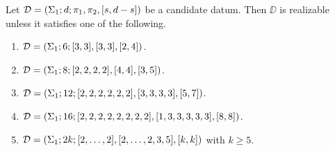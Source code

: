 \begin{theorem} \label{short-partition:th:realizability-on-torus-n-3}
Let $\mathcal{D}=(\Sigma_{1};d;\pi_1,\pi_2,[s,d-s])$ be a candidate datum. Then $\DD$ is realizable unless it satisfies one of the following.
\begin{enumerate}[(1)]
\item $\mathcal{D}=(\Sigma_{1};6;[3,3],[3,3],[2,4])$.
\item $\mathcal{D}=(\Sigma_{1};8;[2,2,2,2],[4,4],[3,5])$.
\item $\mathcal{D}=(\Sigma_{1};12;[2,2,2,2,2,2],[3,3,3,3],[5,7])$.
\item $\mathcal{D}=(\Sigma_{1};16;[2,2,2,2,2,2,2,2],[1,3,3,3,3,3],[8,8])$.
\item $\mathcal{D}=(\Sigma_{1};2k;[2,\ldots,2],[2,\ldots,2,3,5],[k,k])$ with $k\ge 5$.
\end{enumerate}
\end{theorem}
